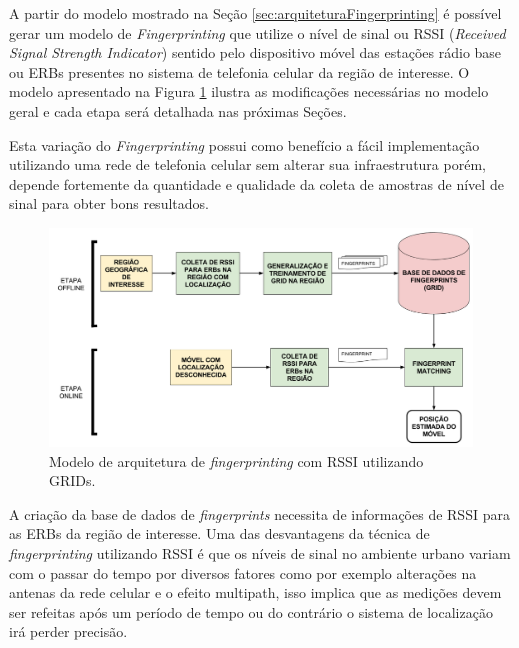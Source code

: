 \documentclass[12pt]{article}
\newcounter{subsubsubsection}[subsubsection]
\begin{document}
            A partir do modelo mostrado na Seção \ref{sec:arquiteturaFingerprinting} é possível gerar um modelo de \textit{Fingerprinting} que utilize o nível de sinal ou RSSI (\textit{Received Signal Strength Indicator}) sentido pelo dispositivo móvel das estações rádio base ou ERBs presentes no sistema de telefonia celular da região de interesse. O modelo apresentado na Figura \ref{fig:arquiteturaFingerprintingRSSI} ilustra as modificações necessárias no modelo geral e cada etapa será detalhada nas próximas Seções.
            
            Esta variação do \textit{Fingerprinting} possui como benefício a fácil implementação utilizando uma rede de telefonia celular sem alterar sua infraestrutura porém, depende fortemente da quantidade e qualidade da coleta de amostras de nível de sinal para obter bons resultados. 
            
            \begin{figure}[H]
                \centering
                \includegraphics[width=16cm]{images/arquiteturaFpRSSI.png}\par
                \caption{Modelo de arquitetura de \textit{fingerprinting} com RSSI utilizando GRIDs.}
                \label{fig:arquiteturaFingerprintingRSSI}
            \end{figure}

                \label{sec:coletaAmostras}

				A criação da base de dados de \textit{fingerprints} necessita de informações de RSSI para as ERBs da região de interesse. Uma das desvantagens da técnica de \textit{fingerprinting} utilizando RSSI é que os níveis de sinal no ambiente urbano variam com o passar do tempo por diversos fatores como por exemplo alterações na antenas da rede celular e o efeito multipath, isso implica que as medições devem ser refeitas após um período de tempo ou do contrário o sistema de localização irá perder precisão.
				
\end{document}
